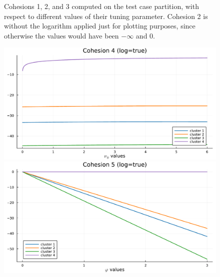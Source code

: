 \documentclass[12pt,	%
	a4paper,		%
	twoside,		%
	openright,		%
	titlepage,%
	]{book}
\theoremstyle{definition}
\begin{document}
\begin{figure}[!p]
    \caption[Cohesions 1, 2, and 3 illustration]{Cohesions 1, 2, and 3 computed on the test case partition, with respect to different values of their tuning parameter. Cohesion 2 is without the logarithm applied just for plotting purposes, since otherwise the values would have been $-\infty$ and $0$.}
    \label{fig: cohesions 123}
\end{figure}


\begin{figure}[!p]
\centering
    \includegraphics[width=1\linewidth]{model description/spatial cohesion analysis/cohesion4.pdf}\\
    \includegraphics[width=1\linewidth]{model description/spatial cohesion analysis/cohesion5.pdf}\\

\end{figure}
\end{document}
